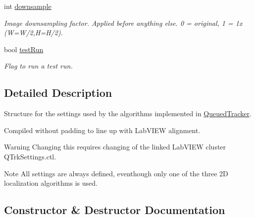 \begin{DoxyCompactItemize}
int \hyperlink{struct_q_trk_settings_ad10a141ae7d18c2e6ce487f147dd7c02}{downsample}
\begin{DoxyCompactList}\small\item\em Image downsampling factor. Applied before anything else. 0 = original, 1 = 1x (W=W/2,H=H/2). \end{DoxyCompactList}\item 
bool \hyperlink{struct_q_trk_settings_aef52bd8e2fdba83af4ce3b4367180d9f}{test\+Run}
\begin{DoxyCompactList}\small\item\em Flag to run a test run. \end{DoxyCompactList}\end{DoxyCompactItemize}


\subsection{Detailed Description}
Structure for the settings used by the algorithms implemented in \hyperlink{class_queued_tracker}{Queued\+Tracker}. 

Compiled without padding to line up with Lab\+V\+I\+EW alignment. \begin{DoxyWarning}{Warning}
Changing this requires changing of the linked Lab\+V\+I\+EW cluster Q\+Trk\+Settings.\+ctl. 
\end{DoxyWarning}
\begin{DoxyNote}{Note}
All settings are always defined, eventhough only one of the three 2D localization algorithms is used. 
\end{DoxyNote}


\subsection{Constructor \& Destructor Documentation}

